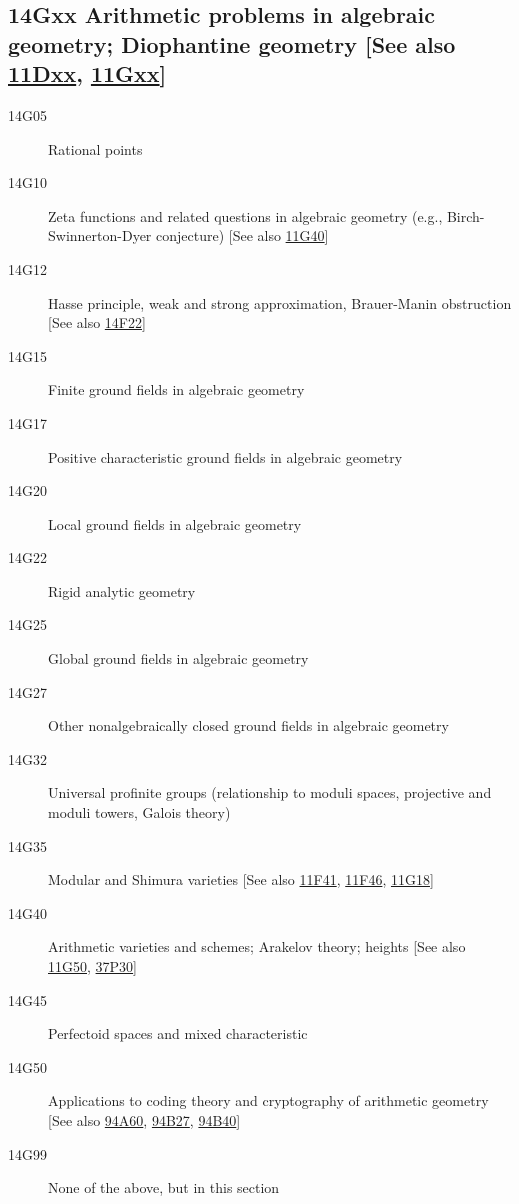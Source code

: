 \subsection*{14Gxx Arithmetic problems in algebraic geometry; Diophantine geometry [See also \hyperref[11Dxx]{11Dxx}, \hyperref[11Gxx]{11Gxx}] }\label{14Gxx}
\begin{description}
\item [14G05]\label{14G05} Rational points
\item [14G10]\label{14G10} Zeta functions and related questions in algebraic geometry (e.g., Birch-Swinnerton-Dyer conjecture) [See also \hyperref[11G40]{11G40}]
\item [14G12]\label{14G12} Hasse principle, weak and strong approximation, Brauer-Manin obstruction [See also \hyperref[14F22]{14F22}]
\item [14G15]\label{14G15} Finite ground fields in algebraic geometry
\item [14G17]\label{14G17} Positive characteristic ground fields in algebraic geometry
\item [14G20]\label{14G20} Local ground fields in algebraic geometry
\item [14G22]\label{14G22} Rigid analytic geometry
\item [14G25]\label{14G25} Global ground fields in algebraic geometry
\item [14G27]\label{14G27} Other nonalgebraically closed ground fields in algebraic geometry
\item [14G32]\label{14G32} Universal profinite groups (relationship to moduli spaces, projective and moduli towers, Galois theory)
\item [14G35]\label{14G35} Modular and Shimura varieties [See also \hyperref[11F41]{11F41}, \hyperref[11F46]{11F46}, \hyperref[11G18]{11G18}]
\item [14G40]\label{14G40} Arithmetic varieties and schemes; Arakelov theory; heights [See also \hyperref[11G50]{11G50}, \hyperref[37P30]{37P30}]
\item [14G45]\label{14G45} Perfectoid spaces and mixed characteristic
\item [14G50]\label{14G50} Applications to coding theory and cryptography of arithmetic geometry [See also \hyperref[94A60]{94A60}, \hyperref[94B27]{94B27}, \hyperref[94B40]{94B40}]
\item [14G99]\label{14G99} None of the above, but in this section
\end{description}          
